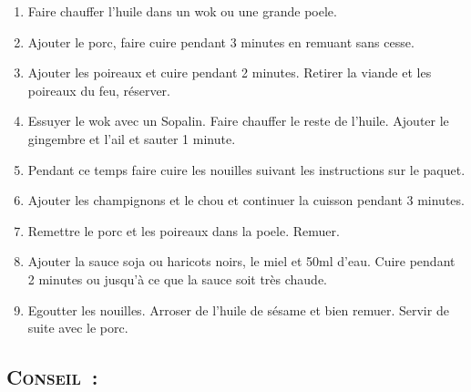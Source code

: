 \begin{enumerate}
\item Faire chauffer l'huile dans un wok ou une grande poele. 
\item Ajouter le porc, faire cuire pendant 3 minutes en remuant sans cesse. 
\item Ajouter les poireaux et cuire pendant 2 minutes. Retirer la viande et les poireaux du feu, r\'eserver.
\item Essuyer le wok avec un Sopalin. Faire chauffer le reste de l'huile. Ajouter le gingembre et l'ail et sauter 1 minute.
\item Pendant ce temps faire cuire les nouilles suivant les instructions sur le paquet.
\item Ajouter les champignons et le chou et continuer la cuisson pendant 3 minutes. 
\item Remettre le porc et les poireaux dans la poele. Remuer. 
\item Ajouter la sauce soja ou haricots noirs, le miel et 50ml d'eau. Cuire pendant 2 minutes ou jusqu'\`a ce que la sauce soit tr\`es chaude.
\item Egoutter les nouilles. Arroser de l'huile de s\'esame et bien remuer. Servir de suite avec le porc.

\end{enumerate}
\subsection*{\textsc{Conseil~:}}
